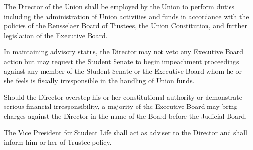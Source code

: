 The Director of the Union shall be employed by the Union to perform duties including the administration of Union activities and funds in accordance with the policies of the Rensselaer Board of Trustees, the Union Constitution, and further legislation of the Executive Board.

\vspace{12pt}

In maintaining advisory status, the Director may not veto any Executive Board action but may request the Student Senate to begin impeachment proceedings against any member of the Student Senate or the Executive Board whom he or she feels is fiscally irresponsible in the handling of Union funds.

\vspace{12pt}

Should the Director overstep his or her constitutional authority or demonstrate serious financial irresponsibility, a majority of the Executive Board may bring charges against the Director in the name of the Board before the Judicial Board.

\vspace{12pt}

The Vice President for Student Life shall act as adviser to the Director and shall inform him or her of Trustee policy.